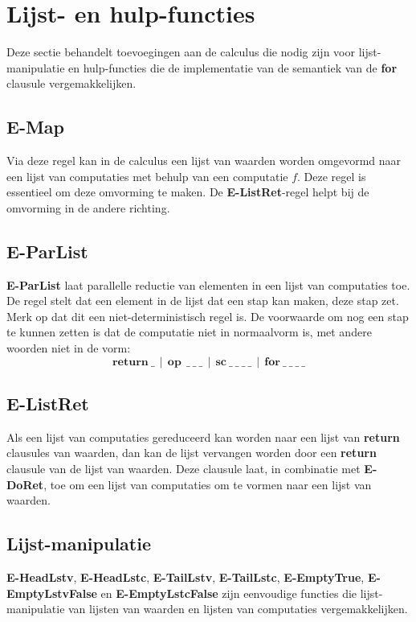 \section{Lijst- en hulp-functies}
Deze sectie behandelt toevoegingen aan de calculus die nodig zijn voor lijst-manipulatie en hulp-functies die de implementatie van de semantiek van de \textbf{for} clausule vergemakkelijken. 
\subsection{E-Map}
Via deze regel kan in de calculus een lijst van waarden worden omgevormd naar een lijst van computaties met behulp van een computatie $f$. Deze regel is essentieel om deze omvorming te maken. De \textbf{E-ListRet}-regel helpt bij de omvorming in de andere richting. 
\subsection{E-ParList}
\textbf{E-ParList} laat parallelle reductie van elementen in een lijst van computaties toe. De regel stelt dat een element in de lijst dat een stap kan maken, deze stap zet. Merk op dat dit een niet-deterministisch regel is. De voorwaarde om nog een stap te kunnen zetten is dat de computatie niet in normaalvorm is, met andere woorden niet in de vorm:
\begin{equation}
    \textbf{return}\:\_ \:\:|\:\:\textbf{op}\:\:\_\:\_\:\_\:\:|\:\:\textbf{sc}\:\_\:\_\:\_\:\_\:\:|\:\:\textbf{for}\:\_\:\_\:\_\:\_
\end{equation}

\subsection{E-ListRet}
Als een lijst van computaties gereduceerd kan worden naar een lijst van \textbf{return} clausules van waarden, dan kan de lijst vervangen worden door een \textbf{return} clausule van de lijst van waarden. Deze clausule laat, in combinatie met \textbf{E-DoRet}, toe om een lijst van computaties om te vormen naar een lijst van waarden.

\subsection{Lijst-manipulatie}
\textbf{E-HeadLstv}, \textbf{E-HeadLstc}, \textbf{E-TailLstv}, \textbf{E-TailLstc}, \textbf{E-EmptyTrue}, \textbf{E-EmptyLstvFalse} en \textbf{E-EmptyLstcFalse} zijn eenvoudige functies die lijst-manipulatie van lijsten van waarden en lijsten van computaties vergemakkelijken.

